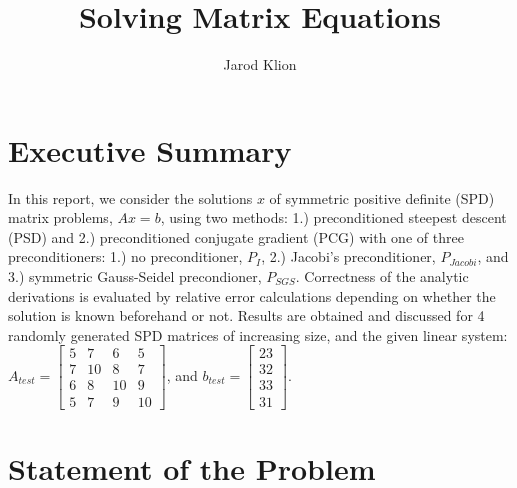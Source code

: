 \documentclass[11pt]{article}
\author{Jarod Klion}
\title{Solving Matrix Equations}
\begin{document}
\maketitle

\section{Executive Summary}

In this report, we consider the solutions $x$ of symmetric positive definite (SPD) matrix problems, $Ax = b$, using two methods: 1.)  preconditioned steepest descent (PSD) and 2.) preconditioned conjugate gradient (PCG) with one of three preconditioners: 1.) no preconditioner, $P_I$, 2.) Jacobi's preconditioner, $P_{Jacobi}$, and 3.) symmetric Gauss-Seidel precondioner, $P_{SGS}$. Correctness of the analytic derivations is evaluated by relative error calculations depending on whether the solution is known beforehand or not. Results are obtained and discussed for 4 randomly generated SPD matrices of increasing size, and the given linear system: $A_{test} = 
\begin{bmatrix} 5 & 7 & 6 & 5 \\ 
		     7 & 10 & 8 & 7 \\
		     6 & 8 & 10 & 9 \\
		     5 & 7 & 9 & 10 \end{bmatrix}$, and
$b_{test} = \begin{bmatrix} 23 \\ 
				    32 \\
				    33 \\
				    31 \end{bmatrix}$.

\section{Statement of the Problem}
\end{document}
